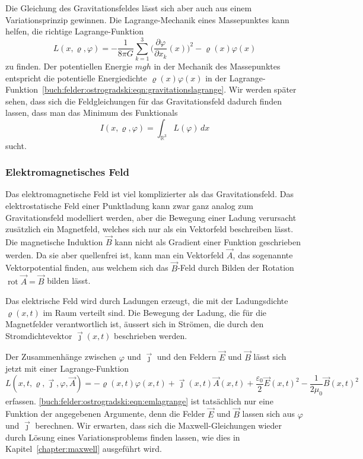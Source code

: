 Die Gleichung des Gravitationsfeldes lässt sich aber auch aus einem
Variationsprinzip gewinnen.
Die Lagrange-Mechanik eines Massepunktes kann helfen, die richtige
Lagrange-Funktion
\begin{equation}
L(x,\varrho,\varphi)
=
-\frac{1}{8\pi G}
\sum_{k=1}^3
\biggl(
\frac{\partial \varphi}{\partial x_k}(x)
\biggr)^2
-
\varrho(x)\varphi(x)
\label{buch:felder:ostrogradski:eqn:gravitationslagrange}
\end{equation}
zu finden.
Der potentiellen Energie $mgh$ in der Mechanik des Massepunktes
entspricht die potentielle Energiedichte $\varrho(x)\varphi(x)$
in der
Lagrange-Funktion~\eqref{buch:felder:ostrogradski:eqn:gravitationslagrange}.
Wir werden später sehen, dass sich die Feldgleichungen für das
Gravitationsfeld dadurch finden lassen, dass man das Minimum des
Funktionals
\[
I(x,\varrho,\varphi)
=
\int_{\mathbb{R}^3} L(\varphi)
\,dx
\]
sucht.

%
%
\subsubsection{Elektromagnetisches Feld}
Das elektromagnetische Feld ist viel komplizierter als das Gravitationsfeld.
Das elektrostatische Feld einer Punktladung kann zwar ganz analog zum
Gravitationsfeld modelliert werden, aber die Bewegung einer Ladung
verursacht zusätzlich ein Magnetfeld, welches sich nur als ein
Vektorfeld beschreiben lässt.
Die magnetische Induktion $\vec{B}$ kann nicht als Gradient einer Funktion
geschrieben werden.
Da sie aber quellenfrei ist, kann man ein Vektorfeld $\vec{A}$,
das sogenannte Vektorpotential finden, aus welchem sich das $\vec{B}$-Feld
durch Bilden der Rotation $\operatorname{rot}\vec{A}=\vec{B}$ bilden
lässt.

Das elektrische Feld wird durch Ladungen erzeugt, die mit der
Ladungsdichte $\varrho(x,t)$ im Raum verteilt sind.
Die Bewegung der Ladung, die für die Magnetfelder verantwortlich ist,
äussert sich in Strömen, die durch den Stromdichtevektor $\vec{\jmath}(x,t)$
beschrieben werden.

Der Zusammenhänge zwischen $\varphi$ und $\vec{\jmath}$ und den Feldern
$\vec{E}$ und $\vec{B}$ lässt sich jetzt mit einer Lagrange-Funktion
\begin{equation}
L(x,t,\varrho,\vec{\jmath},\varphi,\vec{A})
=
-\varrho(x,t) \varphi(x,t)
+
\vec{\jmath}(x,t)\vec{A}(x,t)
+
\frac{\varepsilon_0}{2}\vec{E}(x,t)^2
-
\frac{1}{2\mu_0}\vec{B}(x,t)^2
\label{buch:felder:ostrogradski:eqn:emlagrange}
\end{equation}
erfassen.
\eqref{buch:felder:ostrogradski:eqn:emlagrange} ist tatsächlich nur
eine Funktion der angegebenen Argumente, denn die Felder
$\vec{E}$ und $\vec{B}$ lassen sich aus $\varphi$ und $\vec{\jmath}$ 
berechnen.
Wir erwarten, dass sich die Maxwell-Gleichungen wieder durch
Lösung eines Variationsproblems finden lassen, wie dies in
Kapitel~\ref{chapter:maxwell} ausgeführt wird.

